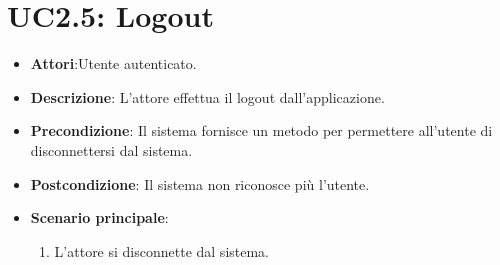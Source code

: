 \section{UC2.5: Logout}
\label{UC2.5}
\begin{itemize}
	\item \textbf{Attori}:Utente autenticato.
	\item \textbf{Descrizione}: L'attore effettua il logout dall'applicazione.
	\item \textbf{Precondizione}: Il sistema fornisce un metodo per permettere all'utente di disconnettersi dal sistema.
	\item \textbf{Postcondizione}: Il sistema non riconosce più l'utente.
	\item \textbf{Scenario principale}:
	\begin{enumerate} \item L'attore si disconnette dal sistema.\end{enumerate}
\end{itemize}

